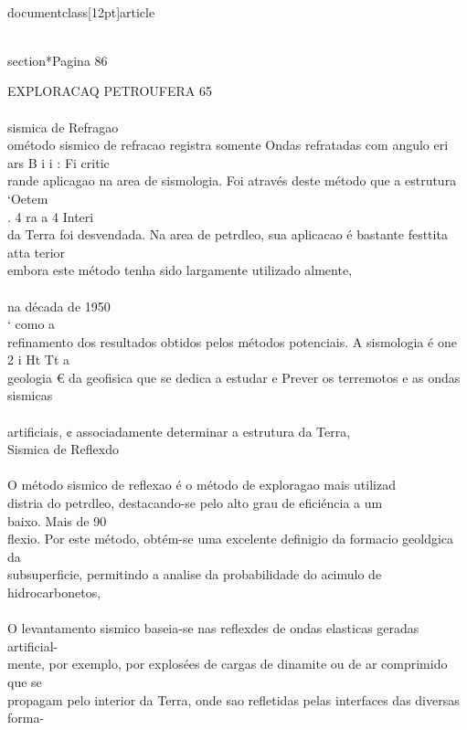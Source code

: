 \\documentclass[12pt]{article}
\begin{document}
{\\section*{Pagina 86}

EXPLORACAQ PETROUFERA 65\\
\\
sismica de Refragao\\
ométodo sismico de refracao registra somente Ondas refratadas com angulo eri\\
ars B i i : Fi critic\\
rande aplicagao na area de sismologia. Foi através deste método que a estrutura ‘Oetem\\
. 4 ra a 4 Interi\\
da Terra foi desvendada. Na area de petrdleo, sua aplicacao é bastante festtita atta terior\\
embora este método tenha sido largamente utilizado almente,\\
\\
na década de 1950\\
‘ como a\\
refinamento dos resultados obtidos pelos métodos potenciais. A sismologia é one\\
2 i Ht Tt a\\
geologia € da geofisica que se dedica a estudar e Prever os terremotos e as ondas sismicas\\
\\
artificiais, ¢ associadamente determinar a estrutura da Terra,\\
Sismica de Reflexdo\\
\\
O método sismico de reflexao é o método de exploragao mais utilizad\\
distria do petrdleo, destacando-se pelo alto grau de eficiéncia a um\\
baixo. Mais de 90\\%
flexio. Por este método, obtém-se uma excelente definigio da formacio geoldgica da\\
subsuperficie, permitindo a analise da probabilidade do acimulo de hidrocarbonetos,\\
\\
O levantamento sismico baseia-se nas reflexdes de ondas elasticas geradas artificial-\\
mente, por exemplo, por explosées de cargas de dinamite ou de ar comprimido que se\\
propagam pelo interior da Terra, onde sao refletidas pelas interfaces das diversas forma-\\
}
\end{document}
